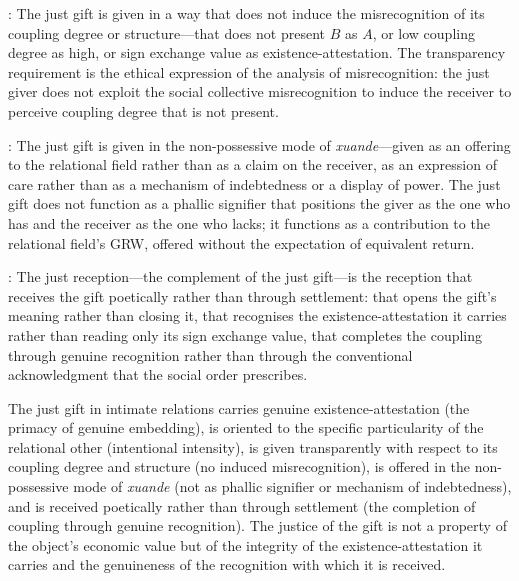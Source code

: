 : The just gift is given in a way that does not induce the misrecognition of its coupling degree or structure---that does not present $B$ as $A$, or low coupling degree as high, or sign exchange value as existence-attestation. The transparency requirement is the ethical expression of the analysis of misrecognition: the just giver does not exploit the social collective misrecognition to induce the receiver to perceive coupling degree that is not present.

: The just gift is given in the non-possessive mode of \emph{xuande}---given as an offering to the relational field rather than as a claim on the receiver, as an expression of care rather than as a mechanism of indebtedness or a display of power. The just gift does not function as a phallic signifier that positions the giver as the one who has and the receiver as the one who lacks; it functions as a contribution to the relational field's GRW, offered without the expectation of equivalent return.

: The just reception---the complement of the just gift---is the reception that receives the gift poetically rather than through settlement: that opens the gift's meaning rather than closing it, that recognises the existence-attestation it carries rather than reading only its sign exchange value, that completes the coupling through genuine recognition rather than through the conventional acknowledgment that the social order prescribes.

\begin{claim}
The just gift in intimate relations carries genuine existence-attestation (the primacy of genuine embedding), is oriented to the specific particularity of the relational other (intentional intensity), is given transparently with respect to its coupling degree and structure (no induced misrecognition), is offered in the non-possessive mode of \emph{xuande} (not as phallic signifier or mechanism of indebtedness), and is received poetically rather than through settlement (the completion of coupling through genuine recognition). The justice of the gift is not a property of the object's economic value but of the integrity of the existence-attestation it carries and the genuineness of the recognition with which it is received.
\end{claim}
